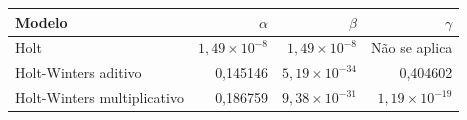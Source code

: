 \begin{tabular}{lrrr}
\toprule
Modelo & $\alpha$ & $\beta$ & $\gamma$ \\
\midrule
Holt & $1,49\times10^{-8}$ & $1,49\times10^{-8}$ & Não se aplica \\
Holt-Winters aditivo & 0,145146 & $5,19\times10^{-34}$ & 0,404602 \\
Holt-Winters multiplicativo & 0,186759 & $9,38\times10^{-31}$ & $1,19\times10^{-19}$ \\
\bottomrule
\end{tabular}
